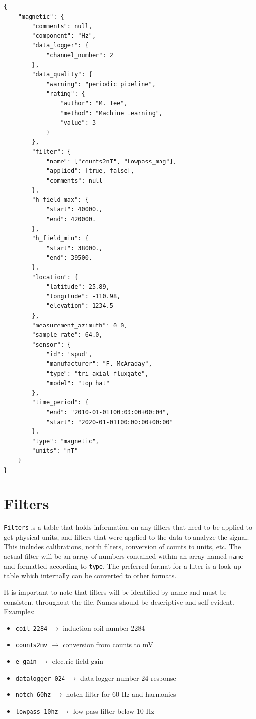 \documentclass{article}
\begin{document}
\begin{verbatim}
{
    "magnetic": {
        "comments": null,
        "component": "Hz",
        "data_logger": {
            "channel_number": 2
        },
        "data_quality": {
            "warning": "periodic pipeline",
            "rating": {
                "author": "M. Tee",
                "method": "Machine Learning",
                "value": 3
            }
        },
        "filter": {
            "name": ["counts2nT", "lowpass_mag"],
            "applied": [true, false],
            "comments": null
        },
        "h_field_max": {
            "start": 40000.,
            "end": 420000.
        },
        "h_field_min": {
            "start": 38000.,
            "end": 39500.
        },
        "location": {
            "latitude": 25.89,
            "longitude": -110.98,
            "elevation": 1234.5
        },
        "measurement_azimuth": 0.0,
        "sample_rate": 64.0,
        "sensor": {
            "id": 'spud',
            "manufacturer": "F. McAraday",
            "type": "tri-axial fluxgate",
            "model": "top hat"
        },
        "time_period": {
            "end": "2010-01-01T00:00:00+00:00",
            "start": "2020-01-01T00:00:00+00:00"
        },
        "type": "magnetic",
        "units": "nT"
    }
}
\end{verbatim}

\newpage
\section{Filters}

\verb|Filters| is a table that holds information on any filters that need to be applied to get physical units, and filters that were applied to the data to analyze the signal.  This includes calibrations, notch filters, conversion of counts to units, etc. The actual filter will be an array of numbers contained within an array named \verb|name| and formatted according to \verb|type|. The preferred format for a filter is a look-up table which internally can be converted to other formats. 

It is important to note that filters will be identified by name and must be consistent throughout the file. Names should be descriptive and self evident. Examples:
\begin{itemize}
    \item \verb|coil_2284| $\longrightarrow$ induction coil number 2284
    \item \verb|counts2mv| $\longrightarrow$ conversion from counts to mV
    \item \verb|e_gain| $\longrightarrow$ electric field gain 
    \item \verb|datalogger_024| $\longrightarrow$ data logger number 24 response
    \item \verb|notch_60hz| $\longrightarrow$ notch filter for 60 Hz and harmonics
    \item \verb|lowpass_10hz| $\longrightarrow$ low pass filter below 10 Hz
\end{itemize}
\end{document}
